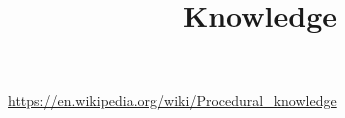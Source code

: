 \documentclass[a4paper]{article}
\title{Knowledge}
\date{}
\begin{document}
    \maketitle

    \url{https://en.wikipedia.org/wiki/Procedural_knowledge}
\end{document}
